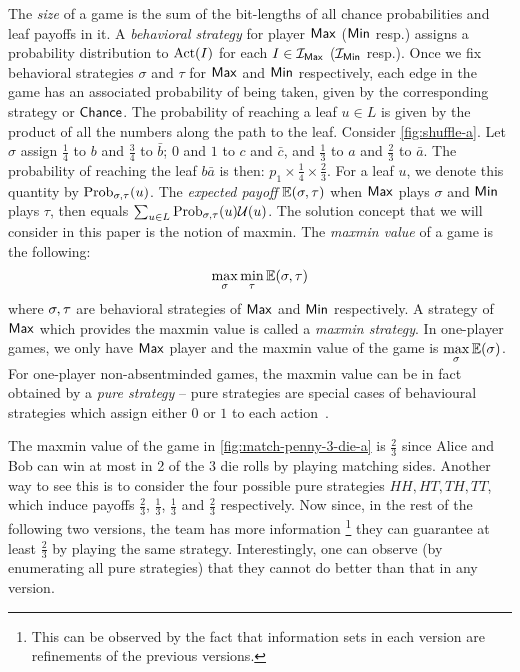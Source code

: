 The \emph{size} of a game is the sum of the bit-lengths of all chance probabilities and leaf
payoffs in it. A \emph{behavioral strategy} for player $\mathsf{Max}$ ($\mathsf{Min}$ resp.) assigns a probability
distribution to $\operatorname{Act}(I)$ for each $I \in \mathcal{I}_{\mathsf{Max}}$ ($\mathcal{I}_{\mathsf{Min}}$ resp.). Once we fix behavioral strategies $\sigma$ and $\tau$ for $\mathsf{Max}$ and $\mathsf{Min}$ respectively,
each edge in the game has an associated probability of being taken,
given by the corresponding strategy or $\mathsf{Chance}$. The probability of reaching a leaf $u \in L$ is given by the product of all the numbers along the path to the leaf. Consider \cref{fig:shuffle-a}.
Let $\sigma$ assign $\frac{1}{4}$ to $b$ and $\frac{3}{4}$ to
$\bar{b}$; $0$ and $1$ to $c$ and $\bar{c}$, and $\frac{1}{3}$ to $a$
and $\frac{2}{3}$ to $\bar{a}$. The probability of reaching the leaf $b \bar{a}$ is 
then: $p_1 \times \frac{1}{4} \times \frac{2}{3}$. For a leaf $u$, we denote this quantity by
$\mathrm{Prob}_{\sigma, \tau}(u)$. The \emph{expected payoff} $\mathbb{E}(\sigma, \tau)$
when $\mathsf{Max}$ plays $\sigma$ and $\mathsf{Min}$ plays $\tau$, then equals
$\sum_{u \in L} \mathrm{Prob}_{\sigma, \tau} (u) \mathcal{U}(u)$. The solution concept that we
will consider in this paper is the notion of maxmin.
The \emph{maxmin value} of a game is the
following: \[\max\limits_{\sigma}\min\limits_{\tau}\mathbb{E}(\sigma,\tau)\] where
$\sigma,\tau$ are behavioral strategies of $\mathsf{Max}$ and $\mathsf{Min}$ respectively. A
strategy of $\mathsf{Max}$ which provides the maxmin value is called a
\emph{maxmin strategy}. In one-player games, we only have $\mathsf{Max}$ player and the maxmin value of the game is $\max\limits_{\sigma}\mathbb{E}(\sigma)$. For one-player non-absentminded games, the maxmin value can be in fact obtained by a \emph{pure strategy} -- pure strategies are special cases of behavioural strategies which assign either $0$ or $1$ to each action~\cite{KollerMegiddo::1992}.

The maxmin value of the game in \cref{fig:match-penny-3-die-a} is $\frac{2}{3}$ since Alice and Bob can win at most in 2 of the 3 die rolls by playing matching sides. Another way to see this is to consider the four possible pure strategies $HH, HT, TH, TT$, which induce payoffs $\frac{2}{3}$, $\frac{1}{3}$, $\frac{1}{3}$ and $\frac{2}{3}$ respectively. Now since, in the rest of the following two versions, the team has more information \footnote{This can be observed by the fact that information sets in each version are refinements of the previous versions.} they can guarantee at least $\frac{2}{3}$ by playing the same strategy. Interestingly, one can observe (by enumerating all pure strategies) that they cannot do better than that in any version. 
